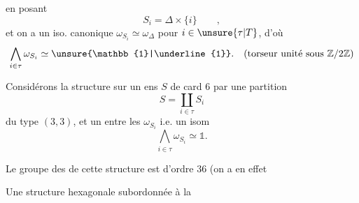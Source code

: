 en posant
\[
S_i=\Delta\times\{i\}\qquad,
\]
et on a un iso. canonique $\omega_{S_i}\simeq\omega_\Delta$ pour  $i\in\unsure{\tau|T}$, d'où
\[
\bigwedge_{i\in\tau}\omega_{S_i}\simeq\unsure{\mathbb{1}|\underline{1}}.
\quad\text{(torseur unité sous $\mathbb Z/2\mathbb Z$)}
\]

Considérons la structure  sur un ens $S$ de card $6$  par une partition
\[
S=\coprod_{i\in\tau}S_i
\]
du type $(3,3)$, et un  entre les $\omega_{S_i}$ i.e. un isom
\[
\bigwedge_{i\in\tau}\omega_{S_i}\simeq\mathbb{1}.\tag*{$(*)$}
\]

 Le groupe des  de cette structure est d'ordre $36$ (on a en effet


Une structure hexagonale subordonnée à la

